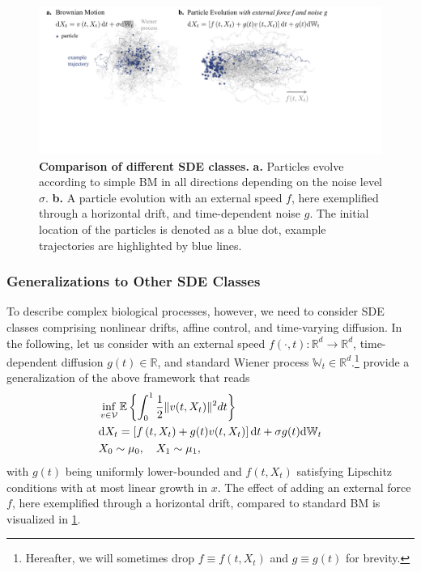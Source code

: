 \begin{figure}[t]
  \includegraphics[width=\textwidth]{figures/fig_comparison_sdes.pdf}
  \caption{\textbf{Comparison of different SDE classes.} \textbf{a.} Particles evolve according to simple \acrshort{BM} in all directions depending on the noise level $\sigma$. \textbf{b.} A particle evolution with an external speed $f$, here exemplified through a horizontal drift, and time-dependent noise $g$. The initial location of the particles is denoted as a blue dot, example trajectories are highlighted by blue lines.}	
  \label{fig:sde_comparison}
\end{figure}

\subsubsection*{Generalizations to Other SDE Classes}
To describe complex biological processes, however, we need to consider \acrshort{SDE} classes comprising nonlinear drifts, affine control, and time-varying diffusion. 
In the following, let us consider  with an external speed $f(\cdot, t): \mathbb{R}^d \rightarrow \mathbb{R}^d$, time-dependent diffusion $g(t) \in \mathbb{R}$, and standard Wiener process $\mathbb{W}_t \in \mathbb{R}^d$.\footnote{Hereafter, we will sometimes drop $f \equiv f(t, X_t)$ and $g \equiv g(t)$ for brevity.} \citet{caluya2021wasserstein, chen2021likelihood} provide a generalization of the above framework that reads
\begin{align}
\label{eq:sb_control_gen}
& \inf _{v \in \mathcal{V}} \mathbb{E}\left\{\int_0^1 \frac{1}{2}\lVert v(t, X_t)\rVert^2 d t\right\}\\
\label{eq:sb_control_constraint_gen}
& \mathrm{d} X_t=\left[f\left(t, X_t\right)+g(t) v(t, X_t)\right] \mathrm{d} t+\sigma g(t) \mathrm{d} \mathbb{W}_t
 \\
\nonumber & X_0 \sim \mu_0, \quad X_1 \sim \mu_1,
\end{align}
with $g(t)$ being uniformly lower-bounded and $f(t, X_t)$ satisfying Lipschitz conditions with at most linear growth in $x$.
The effect of adding an external force $f$, here exemplified through a horizontal drift, compared to standard \acrlong{BM} is visualized in \cref{fig:sde_comparison}.

